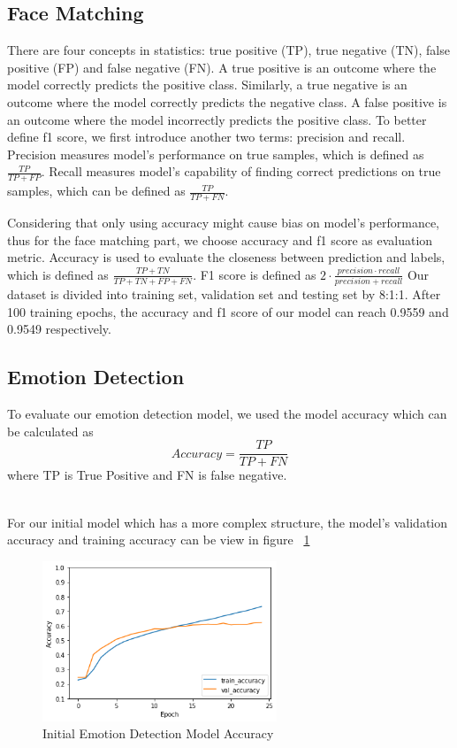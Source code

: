 \documentclass[10pt,twocolumn,letterpaper]{article}
\begin{document}
\subsection{Face Matching}
There are four concepts in statistics: true positive (TP), true negative (TN), false positive (FP) and false negative (FN).
A true positive is an outcome where the model correctly predicts the positive class. Similarly, a true negative is an outcome where the model correctly predicts the negative class. A false positive is an outcome where the model incorrectly predicts the positive class. To better define f1 score, we first introduce another two terms: precision and recall. Precision measures model's performance on true samples, which is defined as $\frac{TP}{TP+FP}$. Recall measures model's capability of finding correct predictions on true samples, which can be defined as $\frac{TP}{TP+FN}$.

Considering that only using accuracy might cause bias on model's performance, thus for the face matching part, we choose accuracy and f1 score as evaluation metric. Accuracy is used to evaluate the closeness between prediction and labels, which is defined as $\frac{TP+TN}{TP+TN+FP+FN}$. F1 score is defined as $2 \cdot \frac{precision \cdot recall}{precision + recall}$ Our dataset is divided into training set, validation set and testing set by 8:1:1. After 100 training epochs, the accuracy and f1 score of our model can reach 0.9559 and 0.9549 respectively. 

\subsection{Emotion Detection}
To evaluate our emotion detection model, we used the model accuracy which can be calculated as
\begin{equation}
    Accuracy = \frac{TP}{TP + FN}
\end{equation}
where TP is True Positive and FN is false negative. 

\\

For our initial model which has a more complex structure, the model's validation accuracy and training accuracy can be view in figure ~\ref{fig:complex_model_result}
\begin{figure}[h]
    \centering
    \includegraphics[width=7cm]{complex_model_result.png}
    \caption{Initial Emotion Detection Model Accuracy}
    \label{fig:complex_model_result}
\end{figure}
\end{document}

